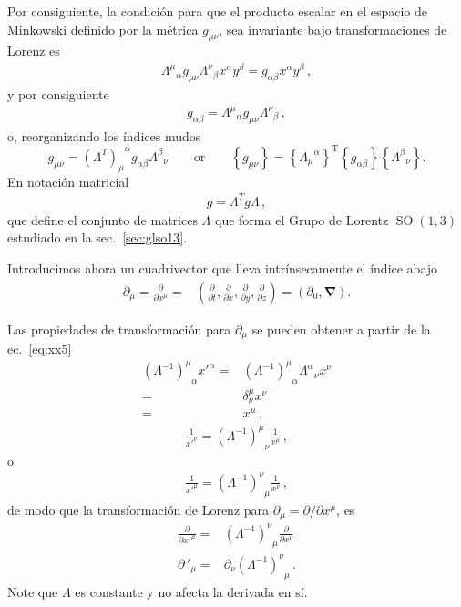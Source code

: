 \begin{frame}
Por consiguiente, la condición para que el producto escalar  en el espacio de Minkowski definido por la métrica $g_{\mu\nu}$, sea invariante bajo transformaciones de Lorenz es
\begin{align}
  {\Lambda^{\mu}}_{\alpha}g_{\mu\nu}{\Lambda^{\nu}}_{\beta}x^{\alpha}y^{\beta}=
  g_{\alpha\beta}x^{\alpha}y^{\beta}\,,
\end{align}
y por consiguiente
\begin{align}
  g_{\alpha\beta}={\Lambda^{\mu}}_{\alpha}g_{\mu\nu}{\Lambda^{\nu}}_{\beta}\,,
\end{align}
o, reorganizando los índices mudos
\begin{equation}
  \label{eq:lrinv}
  g_{\mu\nu}={(\Lambda^{T})_{\mu}}^\alpha g_{\alpha\beta}{\Lambda^\beta}_{\nu}\qquad\text{or}\qquad 
\left\{g_{\mu\nu}\right\}=\left\{{\Lambda_{\mu}}^{\alpha}\right\}^{\text{T}}\left\{g_{\alpha\beta}\right\}\left\{{\Lambda^\beta}_{\nu}\right\}.
\end{equation}
En notación matricial
\begin{align}
 g=\Lambda^T g \Lambda\,,
\end{align}
que define el conjunto de matrices $\Lambda$ que forma el Grupo de Lorentz $\operatorname{SO}(1,3)$ estudiado en la sec.~\ref{sec:glso13}.

Introducimos ahora un cuadrivector que lleva intrínsecamente el índice abajo
\begin{align}
   \partial_\mu=\frac{\partial}{\partial x^\mu}=&\left(
    \frac{\partial}{\partial t},\frac{\partial}{\partial x},\frac{\partial}{\partial y},\frac{\partial}{\partial z}
  \right)
  =(\partial_0,\boldsymbol{\nabla}).
\end{align}



Las propiedades de transformación para $\partial_\mu$ se pueden obtener a partir de la ec.~\eqref{eq:xx5}
\begin{align}
  {\left(\Lambda^{-1}\right)^\mu}_\alpha{x'}^\alpha=&{\left(\Lambda^{-1}\right)^\mu}_\alpha{\Lambda^\alpha}_\nu x^\nu\nonumber\\
=&\delta^\mu_\nu x^\nu\nonumber\\
=&x^\mu\,,
\end{align}
\begin{align}
\label{eq:invtr}
  \frac{1}{{x'}^\nu}= {\left(\Lambda^{-1}\right)^\mu}_\nu\frac{1}{x^\mu}\,,
\end{align}
o
\begin{align}
  \label{eq:183qft}
    \frac{1}{{x'}^\mu}= {\left(\Lambda^{-1}\right)^\nu}_\mu\frac{1}{x^\nu}\,,
\end{align}
de modo que la transformación de Lorenz para $\partial_\mu=\partial/\partial x^\mu$, es
\begin{align}
  \label{eq:dmulrtran}
   \frac{\partial}{{\partial x'}^\mu}=& {\left(\Lambda^{-1}\right)^\nu}_\mu\frac{\partial}{\partial x^\nu}\nonumber\\
   {\partial\,}'_\mu=&\partial_\nu {\left(\Lambda^{-1}\right)^\nu}_\mu\,.
\end{align}
Note que $\Lambda$ es constante y no afecta la derivada en sí.


\end{frame}
